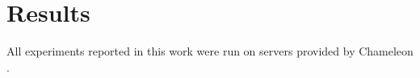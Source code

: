 
\chapter{Results\label{ch:results}}
All experiments reported in this work were run on servers provided by Chameleon \parencite{Keahey2018}.





